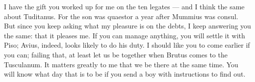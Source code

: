 

 I have the gift you worked up for me on the ten legates --- and I think the same about Tuditanus. For the son was quaestor a year after Mummius was consul. But since you keep asking what my pleasure is on the debts, I keep answering you the same: that it pleases me. If you can manage anything, you will settle it with Piso; Avius, indeed, looks likely to do his duty. I should like you to come earlier if you can; failing that, at least let us be together when Brutus comes to the Tusculanum. It matters greatly to me that we be there at the same time. You will know what day that is to be if you send a boy with instructions to find out.

